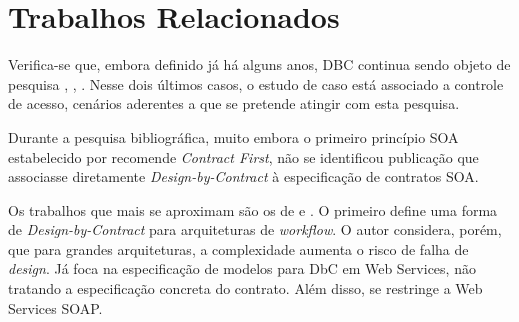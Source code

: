 \section{Trabalhos Relacionados}\label{sec:trabRelacionados}

Verifica-se que, embora definido já há alguns anos, DBC continua
sendo objeto de pesquisa \cite{poyias2014design}, \cite{rubio2013verifying},
\cite{belhaouari2012design}. Nesse dois últimos casos, o estudo de caso está
associado a controle de acesso, cenários aderentes a que se pretende
atingir com esta pesquisa.

Durante a pesquisa bibliográfica, muito embora o primeiro princípio SOA
estabelecido por \cite{erl2008soa} recomende \textit{Contract First}, não se
identificou publicação que associasse diretamente \textit{Design-by-Contract} à
especificação de contratos SOA.

Os trabalhos que mais se aproximam são os de \cite{ling2003describing} e
\cite{heckel2005towards}. O primeiro define uma forma de \textit{Design-by-Contract} para
arquiteturas de \textit{workflow}. O autor considera, porém, que para grandes
arquiteturas, a complexidade aumenta o risco de falha de \textit{design}. Já
\cite{heckel2005towards} foca na especificação de modelos para DbC em Web
Services, não tratando a especificação concreta do contrato. Além disso, se
restringe a Web Services SOAP.

